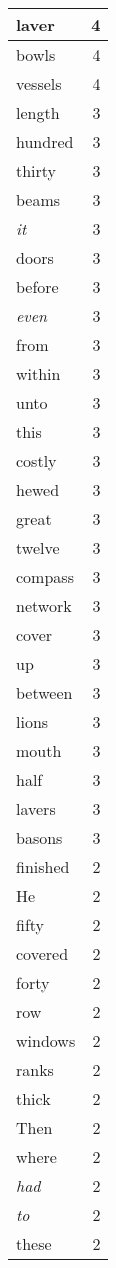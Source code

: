 \begin{center}
\begin{longtable}{l|r}
laver & 4 \\ \hline
bowls & 4 \\ \hline
vessels & 4 \\ \hline
length & 3 \\ \hline
hundred & 3 \\ \hline
thirty & 3 \\ \hline
beams & 3 \\ \hline
\emph{it} & 3 \\ \hline
doors & 3 \\ \hline
before & 3 \\ \hline
\emph{even} & 3 \\ \hline
from & 3 \\ \hline
within & 3 \\ \hline
unto & 3 \\ \hline
this & 3 \\ \hline
costly & 3 \\ \hline
hewed & 3 \\ \hline
great & 3 \\ \hline
twelve & 3 \\ \hline
compass & 3 \\ \hline
network & 3 \\ \hline
cover & 3 \\ \hline
up & 3 \\ \hline
between & 3 \\ \hline
lions & 3 \\ \hline
mouth & 3 \\ \hline
half & 3 \\ \hline
lavers & 3 \\ \hline
basons & 3 \\ \hline
finished & 2 \\ \hline
He & 2 \\ \hline
fifty & 2 \\ \hline
covered & 2 \\ \hline
forty & 2 \\ \hline
row & 2 \\ \hline
windows & 2 \\ \hline
ranks & 2 \\ \hline
thick & 2 \\ \hline
Then & 2 \\ \hline
where & 2 \\ \hline
\emph{had} & 2 \\ \hline
\emph{to} & 2 \\ \hline
these & 2 \\ \hline

\end{longtable}
\end{center}
